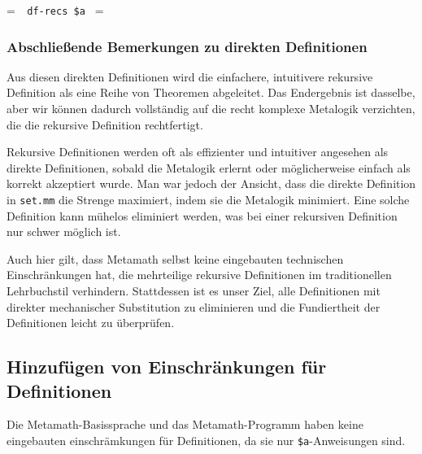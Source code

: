 \setbox\startprefix=\hbox{\tt \ \ df-recs\ \$a\ }
\setbox\contprefix=\hbox{\tt \ \ \ \ \ \ \ \ \ \ \ \ \ }
\startm
\m{\vdash}\m{(}\m{)}\m{=}\m{\bigcup}\m{\{}\m{|}\m{\exists}\m{\in}\m{(}\m{\wedge}\m{\forall}\m{\in}\m{(}\m{)}\m{=}\m{(}\m{(}\m{\restriction}\m{)}\m{)}\m{)}\m{\}}
\endm

\subsubsection{Abschließende Bemerkungen zu direkten Definitionen}

Aus diesen direkten Definitionen wird die einfachere, intuitivere rekursive Definition als eine Reihe von Theoremen abgeleitet. Das Endergebnis ist dasselbe, aber wir können dadurch vollständig auf die recht komplexe Metalogik verzichten, die die rekursive Definition rechtfertigt.

Rekursive Definitionen werden oft als effizienter und intuitiver angesehen als direkte Definitionen, sobald die Metalogik erlernt oder möglicherweise einfach als korrekt akzeptiert wurde.  Man war jedoch der Ansicht, dass die direkte Definition in \texttt{set.mm} die Strenge maximiert, indem sie die Metalogik minimiert.  Eine solche Definition kann mühelos eliminiert werden, was bei einer rekursiven Definition nur schwer möglich ist.

Auch hier gilt, dass Metamath selbst keine eingebauten technischen Einschränkungen hat, die mehrteilige rekursive Definitionen im traditionellen Lehrbuchstil verhindern. Stattdessen ist es unser Ziel, alle Definitionen mit direkter mechanischer Substitution zu eliminieren und die Fundiertheit der Definitionen leicht zu überprüfen.

\subsection{Hinzufügen von Einschränkungen für Definitionen}

Die Metamath-Basissprache und das Metamath-Programm haben keine eingebauten einschrämkungen für Definitionen, da sie nur \texttt{\$a}-Anweisungen sind.

